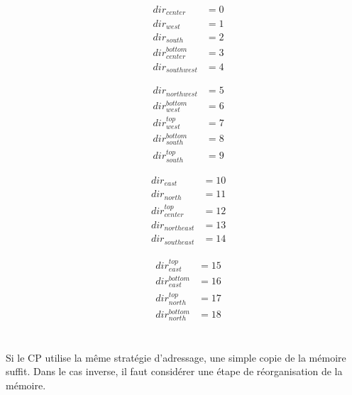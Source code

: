 \noindent\begin{minipage}{.25\linewidth}
\begin{align*}
&dir_{center} &=  0 \\
&dir_{west} &=  1 \\
&dir_{south} &=  2 \\
&dir_{center}^{bottom} &=  3 \\
&dir_{south west} &=  4
\end{align*}
\end{minipage}%
\begin{minipage}{.25\linewidth}
\begin{align*}
&dir_{north west} &=  5 \\
&dir_{west}^{bottom} &=  6 \\
&dir_{west}^{top} &=  7 \\
&dir_{south}^{bottom} &=  8 \\
&dir_{south}^{top} &=  9 
\end{align*}
\end{minipage}%
\begin{minipage}{.25\linewidth}
\begin{align*}
&dir_{east} &= 10 \\
&dir_{north} &= 11 \\
&dir_{center}^{top} &= 12 \\
&dir_{north east} &= 13 \\
&dir_{south east} &= 14 
\end{align*}
\end{minipage}
\begin{minipage}{.25\linewidth}
\begin{align*}
&dir_{east}^{top} &= 15 \\
&dir_{east}^{bottom} &= 16 \\
&dir_{north}^{top} &= 17 \\
&dir_{north}^{bottom} &= 18\\
\end{align*}
\end{minipage}\\

Si le \ac{CP} utilise la même stratégie d'adressage, une simple copie de la mémoire suffit. Dans le cas inverse, il faut considérer une étape de réorganisation de la mémoire.

